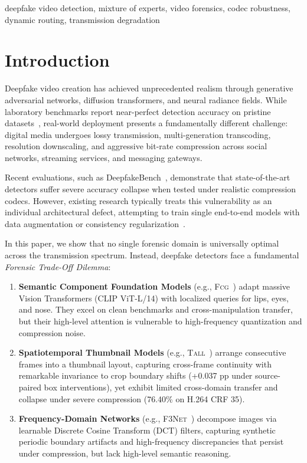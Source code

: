 \documentclass[conference]{IEEEtran}
\newcommand{\tall}{\textsc{Tall}}
\newcommand{\fcg}{\textsc{Fcg}}
\newcommand{\fthreenet}{\textsc{F3Net}}
\newcommand{\pp}{pp}
\begin{document}
\begin{IEEEkeywords}
deepfake video detection, mixture of experts, video forensics, codec robustness, dynamic routing, transmission degradation
\end{IEEEkeywords}

\section{Introduction}

Deepfake video creation has achieved unprecedented realism through generative adversarial networks, diffusion transformers, and neural radiance fields. While laboratory benchmarks report near-perfect detection accuracy on pristine datasets~\cite{rossler2019faceforensics,xu2023tall}, real-world deployment presents a fundamentally different challenge: digital media undergoes lossy transmission, multi-generation transcoding, resolution downscaling, and aggressive bit-rate compression across social networks, streaming services, and messaging gateways.

Recent evaluations, such as DeepfakeBench~\cite{yan2023deepfakebench}, demonstrate that state-of-the-art detectors suffer severe accuracy collapse when tested under realistic compression codecs. However, existing research typically treats this vulnerability as an individual architectural defect, attempting to train single end-to-end models with data augmentation or consistency regularization~\cite{wang2023altfreezing,kashiani2025freqdebias}. 

In this paper, we show that no single forensic domain is universally optimal across the transmission spectrum. Instead, deepfake detectors face a fundamental \emph{Forensic Trade-Off Dilemma}:
\begin{enumerate}
    \item \textbf{Semantic Component Foundation Models} (e.g., \fcg{}~\cite{han2025fcg}) adapt massive Vision Transformers (CLIP ViT-L/14) with localized queries for lips, eyes, and nose. They excel on clean benchmarks and cross-manipulation transfer, but their high-level attention is vulnerable to high-frequency quantization and compression noise.
    \item \textbf{Spatiotemporal Thumbnail Models} (e.g., \tall{}~\cite{xu2023tall}) arrange consecutive frames into a thumbnail layout, capturing cross-frame continuity with remarkable invariance to crop boundary shifts (+0.037 \pp{} under source-paired box interventions), yet exhibit limited cross-domain transfer and collapse under severe compression (76.40\% on H.264 CRF 35).
    \item \textbf{Frequency-Domain Networks} (e.g., \fthreenet{}~\cite{qian2020f3net}) decompose images via learnable Discrete Cosine Transform (DCT) filters, capturing synthetic periodic boundary artifacts and high-frequency discrepancies that persist under compression, but lack high-level semantic reasoning.
\end{enumerate}
\end{document}
